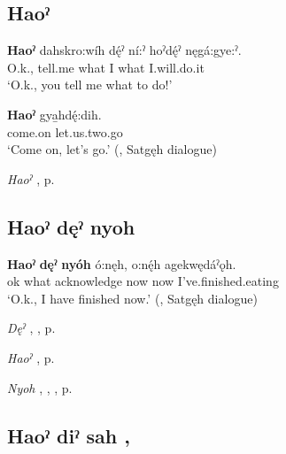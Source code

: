 \subsection*{\textbf{Haoˀ} } \label{p:[haoˀ] ‘come on!’}

\ea
\label{ex:hpar4}
\gll \textbf{Haoˀ} dahskro:wíh dę́ˀ ní:ˀ hoˀdę́ˀ nęgá:gye:ˀ.\\
O.k., tell.me what I what I.will.do.it\\
\glt ‘O.k., you tell me what to do!’
\z

\ea
\label{ex:hpar5}
\gll \textbf{Haoˀ} gya̱hdę́:dih.\\
come.on let.us.two.go\\
\glt ‘Come on, let’s go.’ (\cite[142]{mithun_watewayestanih_1984}, Satgęh dialogue)
\z

\begin{CayugaRelated}
\item \textit{Haoˀ} , p. \pageref{p:[haoˀ] ‘o.k.!’}
\end{CayugaRelated}

\subsection*{\textbf{Haoˀ dęˀ nyoh} } \label{p:[haoˀ dęˀ nyoh]}

\ea
\label{ex:hpar6}
\gll \textbf{Haoˀ} \textbf{dęˀ} \textbf{nyóh} ó:nęh, o:nę́h agekwędáˀǫh.\\
ok what acknowledge now now I’ve.finished.eating\\
\glt ‘O.k., I have finished now.’ (\cite[142]{mithun_watewayestanih_1984}, Satgęh dialogue)
\z

\begin{CayugaRelated}
\item \textit{Dęˀ} , , p. \pageref{p:[dęˀ-]}\\
\item \textit{Haoˀ} , p. \pageref{p:[haoˀ] ‘o.k.!’}\\
\item \textit{Nyoh} , , , p. \pageref{p:[nyoh]}
\end{CayugaRelated}

\subsection*{\textbf{Haoˀ diˀ sah} , } \label{p:[haoˀ diˀ sah]}

